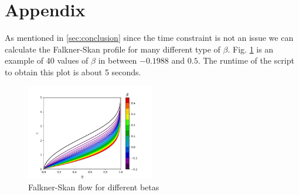 \documentclass[conf]{new-aiaa}
\begin{document}
\section{Appendix}
As mentioned in \ref{sec:conclusion} since the time constraint is not an issue we can calculate the Falkner-Skan profile for many different type of $\beta$. Fig. \ref{fig:Falkner-Skan multiples betas} is an example of 40 values of $\beta$ in between $-0.1988$ and $0.5$. The runtime of the script to obtain this plot is about 5 seconds.
\begin{figure}[H]
    \centering
    \includegraphics[width=0.5\textwidth]{Continuous beta.png}
    \caption{Falkner-Skan flow for different betas}
    \label{fig:Falkner-Skan multiples betas}
\end{figure}
\end{document}
